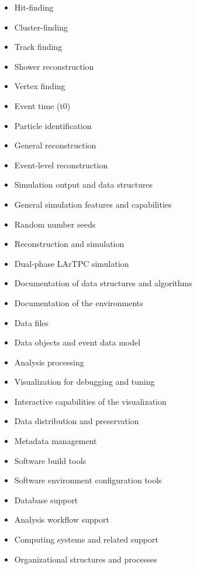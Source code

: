 \begin {itemize}
\item Hit-finding
\item Cluster-finding
\item Track finding
\item Shower reconstruction
\item Vertex finding
\item Event time (t0)
\item Particle identification
\item General reconstruction
\item Event-level reconstruction
\item Simulation output and data structures
\item General simulation features and capabilities
\item Random number seeds
\item Reconstruction and simulation
\item Dual-phase LArTPC simulation
\item Documentation of data structures and algorithms
\item Documentation of the environments
\item Data files
\item Data objects and event data model
\item Analysis processing
\item Visualization for debugging and tuning
\item Interactive capabilities of the visualization
\item Data distribution and preservation
\item Metadata management
\item Software build tools
\item Software environment configuration tools
\item Database support
\item Analysis workflow support
\item Computing systems and related support
\item Organizational structures and processes
\end {itemize}
